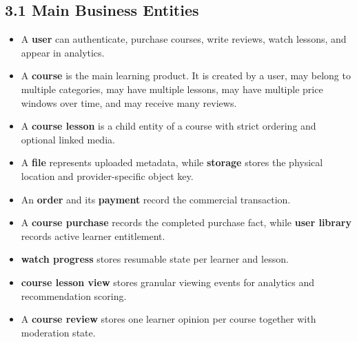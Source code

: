 \documentclass[11pt,a4paper]{article}
\begin{document}
\subsection*{3.1 Main Business Entities}
\begin{itemize}[leftmargin=1.5em]
	\item A \textbf{user} can authenticate, purchase courses, write reviews, watch lessons, and appear in analytics.
	\item A \textbf{course} is the main learning product. It is created by a user, may belong to multiple categories, may have multiple lessons, may have multiple price windows over time, and may receive many reviews.
	\item A \textbf{course lesson} is a child entity of a course with strict ordering and optional linked media.
	\item A \textbf{file} represents uploaded metadata, while \textbf{storage} stores the physical location and provider-specific object key.
	\item An \textbf{order} and its \textbf{payment} record the commercial transaction.
	\item A \textbf{course purchase} records the completed purchase fact, while \textbf{user library} records active learner entitlement.
	\item \textbf{watch progress} stores resumable state per learner and lesson.
	\item \textbf{course lesson view} stores granular viewing events for analytics and recommendation scoring.
	\item A \textbf{course review} stores one learner opinion per course together with moderation state.
\end{itemize}
\end{document}
